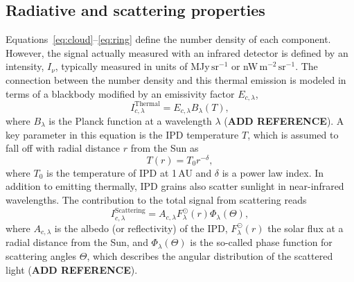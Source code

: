\documentclass[twocolumn]{aa}
\begin{document}
\subsection{Radiative and scattering properties}
Equations~\eqref{eq:cloud}--\eqref{eq:ring} define the number density
of each component. However, the signal actually measured with an
infrared detector is defined by an intensity, $I_{\nu}$, typically
measured in units of MJy$\,\mathrm{sr}^{-1}$ or
nW$\,\mathrm{m}^{-2}\,\mathrm{sr}^{-1}$. The connection between the
number density and this thermal emission is modeled in terms
of a blackbody modified by an emissivity factor $E_{c, \lambda}$,
\begin{equation}
    I^\mathrm{Thermal}_{c,\lambda} = E_{c,\lambda} B_\lambda(T),
\end{equation}
where $B_\lambda$ is the Planck function at a wavelength $\lambda$
({\bf ADD REFERENCE}). A key parameter in this equation is the IPD
temperature $T$, which is assumed to fall off with radial distance $r$
from the Sun as
\begin{equation}
    T(r) = T_0 r^{-\delta},
\end{equation}
where $T_0$ is the temperature of IPD at 1\,AU and $\delta$ is a power
law index. In addition to emitting thermally, IPD grains also scatter
sunlight in near-infrared wavelengths. The contribution to the total
signal from scattering reads
\begin{equation}\label{eq: scat_term}
    I^\mathrm{Scattering}_{c, \lambda} = A_{c, \lambda} F_\lambda^\odot(r) \Phi_\lambda(\Theta),
\end{equation}
where $A_{c, \lambda}$ is the albedo (or reflectivity) of the IPD,
$F_\lambda^\odot(r)$ the solar flux at a radial distance from the Sun,
and $\Phi_\lambda(\Theta)$ is the so-called phase function for scattering angles
$\Theta$, which describes the angular distribution of the scattered
light ({\bf ADD REFERENCE}).
\end{document}
